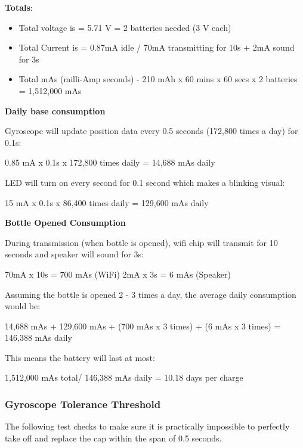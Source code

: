 \documentclass[12pt]{article}
\begin{document}
		\textbf{Totals}:
		\begin{itemize}
			\item Total voltage is = 5.71 V = 2 batteries needed (3 V each)
			\item Total Current is = 0.87mA idle / 70mA transmitting for 10s + 2mA sound for 3s
			\item Total mAs (milli-Amp seconds) - 210 mAh x 60 mins x 60 secs x 2 batteries = 1,512,000 mAs 
		\end{itemize}

		
		\textbf{Daily base consumption}
		
		Gyroscope will update position data every 0.5 seconds (172,800 times a day) for 0.1s:
		\begin{center}
			0.85 mA x 0.1s x 172,800 times daily = 14,688 mAs daily
		\end{center}
		
		LED will turn on every second for 0.1 second which makes a blinking visual:
		\begin{center}
			15 mA x 0.1s x 86,400 times daily = 129,600 mAs daily
		\end{center}
		
		\textbf{Bottle Opened Consumption}
		
		During transmission (when bottle is opened), wifi chip will transmit for 10 seconds and speaker will sound for 3s:
		\begin{center}
			70mA x 10s = 700 mAs (WiFi)
		2mA x 3s = 6 mAs (Speaker)
		\end{center}
	
		Assuming the bottle is opened 2 - 3 times a day, the average daily consumption would be:
		\begin{center}
			14,688 mAs + 129,600 mAs +  (700 mAs x 3 times) + (6 mAs x 3 times) = 146,388 mAs daily
		\end{center}
		
		This means the battery will last at most:
		\begin{center}
			1,512,000 mAs total/ 146,388  mAs daily = 10.18 days per charge
		\end{center}
		
		\subsubsection*{Gyroscope Tolerance Threshold}
		The following test checks to make sure it is practically impossible to perfectly take off and replace the cap within the span of 0.5 seconds.
		
\end{document}
